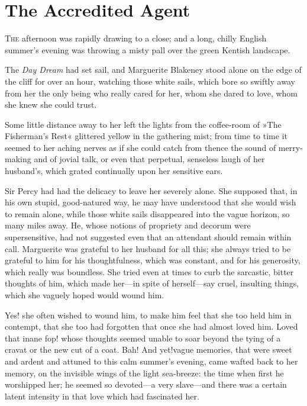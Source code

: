 
\chapter{The Accredited Agent}
\lettrine[lines=4]{T}{he} afternoon was rapidly drawing to a close; and a long, chilly English summer's evening was throwing a misty pall over the green Kentish landscape.

\zz
The \textit{Day Dream} had set sail, and Marguerite Blake\-ney stood alone on the edge of the cliff for over an hour, watching those white sails, which bore so swiftly away from her the only being who really cared for her, whom she dared to love, whom she knew she could trust.

Some little distance away to her left the lights from the coffee-room of »The Fisherman's Rest« glittered yellow in the gathering mist; from time to time it seemed to her aching nerves as if she could catch from thence the sound of merry-making and of jovial talk, or even that perpetual, senseless laugh of her husband's, which grated continually upon her sensitive ears.

Sir Percy had had the delicacy to leave her severely alone. She supposed that, in his own stupid, good-natured way, he may have understood that she would wish to remain alone, while those white sails disappeared into the vague horizon, so many miles away. He, whose notions of propriety and decorum were supersensitive, had not suggested even that an attendant should remain within call. Marguerite was grateful to her husband for all this; she always tried to be grateful to him for his thoughtfulness, which was constant, and for his generosity, which really was boundless. She tried even at times to curb the sarcastic, bitter thoughts of him, which made her—in spite of herself—say cruel, insulting things, which she vaguely hoped would wound him.

Yes! she often wished to wound him, to make him feel that she too held him in contempt, that she too had forgotten that once she had almost loved him. Loved that inane fop! whose thoughts seemed unable to soar beyond the tying of a cravat or the new cut of a coat. Bah! And yet!\textellipsis \allowbreak  vague memories, that were sweet and ardent and attuned to this calm summer's evening, came wafted back to her memory, on the invisible wings of the light sea-breeze: the time when first he worshipped her; he seemed so devoted—a very slave—and there was a certain latent intensity in that love which had fascinated her.

